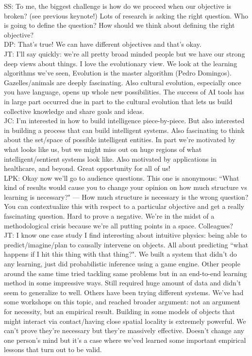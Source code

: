 SS: To me, the biggest challenge is how do we proceed when our objective is broken? (see previous keynote!) Lots of research is asking the right question. Who is going to define the question? How should we think about defining the right objective? \\

DP: That's true! We can have different objectives and that's okay. \\

JT: I'll say quickly: we're all pretty broad minded people but we have our strong deep views about things. I love the evolutionary view. We look at the learning algorithms we've seen, Evolution is the master algorithm (Pedro Domingos). Gazelles/animals are deeply fascinating. Also cultural evolution, especially once you have language, opens up whole new possibilities. The success of AI tools has in large part occurred due in part to the cultural evolution that lets us build collective knowledge and share goals and ideas. \\

JC: I'm interested in how to build intelligence piece-by-piece. But also interested in building a process that can build intelligent systems. Also fascinating to think about the set/space of possible intelligent entities. In part we're motivated by what looks like us, but we might miss out on huge regions of what intelligent/sentient systems look like. Also motivated by applications in healthcare, and beyond. Great opportunity for all of us! \\

LPK: Okay now we'll go to audience questions. This one is anonymous: ``What kind of results would cause you to change your opinion on how much structure vs learning is necessary?" --- How much structure is necessary is the wrong question? You can contextualize this with respect to a particular objective and get a really fascinating question. Hard to prove a negative. We're in the midst of a methodological crisis because we're all putting points in a space. Colleagues? \\

JT: I know one case study I find interesting about intuitive physics: being able to predict/imagine/plan to causally intervene on objects. All about predicting ``what happens if I hit this thing with that thing?". We built a system that didn't do any learning, just did probabilistic inference using a game engine. Other people around the same time tried tackling same problems but in an end-to-end learning method in some impressive ways. Still required huge amount of data and didn't seem to generalize to well. Others have been trying different systems. We've had some workshops on this topic, and reached broader argument: not an argument for necessity, but an empirical result. Building in some models of objects that might interact via contact/having close spatial locality is extremely powerful. We can't prove they're necessary but they're massively effective. Doesn't change any one person's mind but it's a case where we'ved learned some important empirical lessons that turn out to be valid. \\


